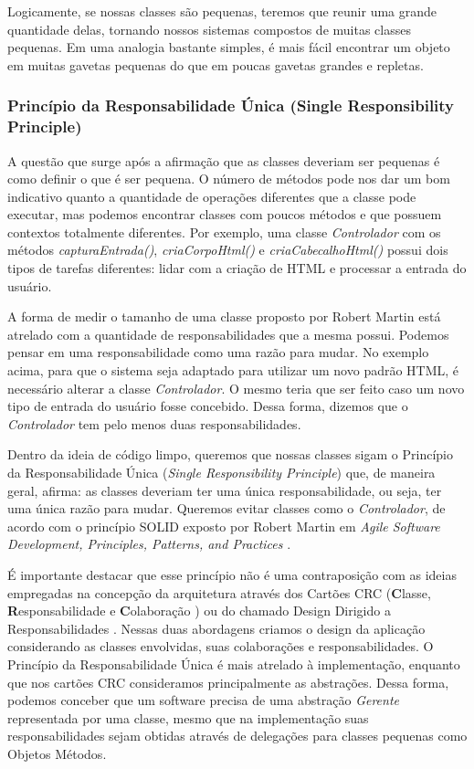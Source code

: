 Logicamente, se nossas classes são pequenas, teremos que reunir uma grande quantidade delas, tornando nossos sistemas compostos de muitas classes pequenas. Em uma analogia bastante simples, é mais fácil encontrar um objeto em muitas gavetas pequenas do que em poucas gavetas grandes e repletas.

\subsubsection{Princípio da Responsabilidade Única (Single Responsibility Principle)}
A questão que surge após a afirmação que as classes deveriam ser pequenas é como definir o que é ser pequena. O número de métodos pode nos dar um bom indicativo quanto a quantidade de operações diferentes que a classe pode executar, mas podemos encontrar classes com poucos métodos e que possuem contextos totalmente diferentes. Por exemplo, uma classe \textit{Controlador} com os métodos \textit{capturaEntrada()}, \textit{criaCorpoHtml()} e \textit{criaCabecalhoHtml()} possui dois tipos de tarefas diferentes: lidar com a criação de HTML e processar a entrada do usuário.
	
A forma de medir o tamanho de uma classe proposto por Robert Martin está atrelado com a quantidade de responsabilidades que a mesma possui. Podemos pensar em uma responsabilidade como uma razão para mudar. No exemplo acima, para que o sistema seja adaptado para utilizar um novo padrão HTML, é necessário alterar a classe \textit{Controlador}. O mesmo teria que ser feito caso um novo tipo de entrada do usuário fosse concebido. Dessa forma, dizemos que o \textit{Controlador} tem pelo menos duas responsabilidades.
	
Dentro da ideia de código limpo, queremos que nossas classes sigam o Princípio da Responsabilidade Única (\textit{Single Responsibility Principle}) que, de maneira geral, afirma: as classes deveriam ter uma única responsabilidade, ou seja, ter uma única razão para mudar. Queremos evitar classes como o \textit{Controlador}, de acordo com o princípio SOLID exposto por Robert Martin em \textit{Agile Software Development, Principles, Patterns, and Practices} \citep{Martin2002}.

É importante destacar que esse princípio não é uma contraposição com as ideias empregadas na concepção da arquitetura através dos Cartões CRC (\textbf{C}lasse, \textbf{R}esponsabilidade e \textbf{C}olaboração \citep{crc89})  ou do chamado Design Dirigido a Responsabilidades \citep{Wirfs-Brock03}. Nessas duas abordagens criamos o design da aplicação considerando as classes envolvidas, suas colaborações e responsabilidades. O Princípio da Responsabilidade Única é mais atrelado à implementação, enquanto que nos cartões CRC consideramos principalmente as abstrações. Dessa forma, podemos conceber que um software precisa de uma abstração \textit{Gerente} representada por uma classe, mesmo que na implementação suas responsabilidades sejam obtidas através de delegações para classes pequenas como Objetos Métodos.

